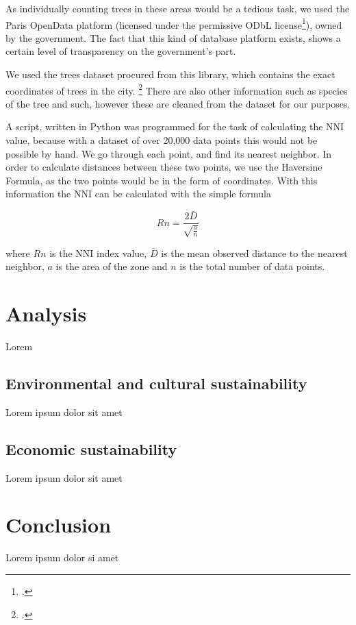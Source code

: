 \documentclass[11pt,letterpaper]{article}
\begin{document}
As individually counting trees in these areas would be a tedious task, we used the Paris OpenData platform (licensed under the permissive ODbL license\footcite{odbl}), owned by the government. The fact that this kind of database platform exists, shows a certain level of transparency on the government's part.

We used the trees dataset procured from this library, which contains the exact coordinates of trees in the city. \footcite{paris_opendata} There are also other information such as species of the tree and such, however these are cleaned from the dataset for our purposes.

A script, written in Python was programmed for the task of calculating the NNI value, because with a dataset of over 20,000 data points this would not be possible by hand. We go through each point, and find its nearest neighbor. In order to calculate distances between these two points, we use the Haversine Formula, as the two points would be in the form of coordinates. With this information the NNI can be calculated with the simple formula

$$Rn = \frac{2 \bar D}{\sqrt{\frac{a}{n}}}$$

where $Rn$ is the NNI index value, $\bar D$ is the mean observed distance to the nearest neighbor, $a$ is the area of the zone and $n$ is the total number of data points.




\section{Analysis}

Lorem

\subsection{Environmental and cultural sustainability}
Lorem ipsum dolor sit amet

\subsection{Economic sustainability}
Lorem ipsum dolor sit amet

\section{Conclusion}

Lorem ipsum dolor si amet
\end{document}
